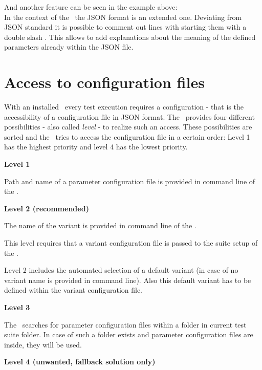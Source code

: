 
And another feature can be seen in the example above:\\
In the context of the \pkg\ the JSON format is an extended one.
Deviating from JSON standard it is possible to comment out lines with starting them with a double slash \pcode{//}.
This allows to add explanations about the meaning of the defined parameters already within the JSON file.

\newpage

\section{Access to configuration files}

With an installed \pkg\ every test execution requires a configuration - that is the accessibility
of a configuration file in JSON format. The \pkg\ provides four different possibilities - also
called \textit{level} - to realize such an access. These possibilities are sorted and the \pkg\ tries to access
the configuration file in a certain order: Level 1 has the highest priority and level 4 has the lowest priority.

\textbf{Level 1}

Path and name of a parameter configuration file is provided in command line of the \rfwcore.

\textbf{Level 2 (recommended)}

The name of the variant is provided in command line of the \rfwcore.

This level requires that a variant configuration file is passed to the suite setup of the \pkg.

Level 2 includes the automated selection of a default variant (in case of no variant name is provided in command line).
Also this default variant has to be defined within the variant configuration file.

\textbf{Level 3}

The \pkg\ searches for parameter configuration files within a folder  in current test suite folder.
In case of such a folder exists and parameter configuration files are inside, they will be used.

\textbf{Level 4 (unwanted, fallback solution only)}

